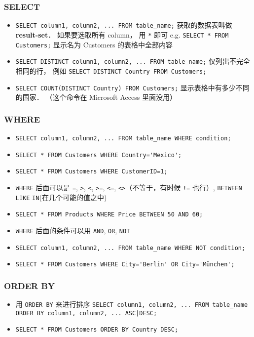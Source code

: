 \subsubsection{SELECT}
\begin{itemize}
\item \verb`SELECT column1, column2, ... FROM table_name;` 获取的数据表叫做 \textbf{result-set}． 如果要选取所有 column， 用 \verb`*` 即可 e.g. \verb`SELECT * FROM Customers;` 显示名为 Customers 的表格中全部内容
\item \verb`SELECT DISTINCT column1, column2, ... FROM table_name;` 仅列出不完全相同的行， 例如 \verb`SELECT DISTINCT Country FROM Customers;`
\item \verb`SELECT COUNT(DISTINCT Country) FROM Customers;` 显示表格中有多少不同的国家． （这个命令在 Microsoft Access 里面没用）
\end{itemize}

\subsubsection{WHERE}
\begin{itemize}
\item \verb`SELECT column1, column2, ... FROM table_name WHERE condition;`
\item \verb`SELECT * FROM Customers WHERE Country='Mexico';`
\item \verb`SELECT * FROM Customers WHERE CustomerID=1;`
\item \verb`WHERE` 后面可以是 \verb`=`, \verb`>`, \verb`<`, \verb`>=`, \verb`<=`, \verb`<>`（不等于，有时候 \verb`!=` 也行）, \verb`BETWEEN` \verb`LIKE` \verb`IN`(在几个可能的值之中)
\item \verb`SELECT * FROM Products WHERE Price BETWEEN 50 AND 60;`
\item \verb`WHERE` 后面的条件可以用 \verb`AND`, \verb`OR`, \verb`NOT`
\item \verb`SELECT column1, column2, ... FROM table_name WHERE NOT condition;`
\item \verb`SELECT * FROM Customers WHERE City='Berlin' OR City='München';`
\end{itemize}

\subsubsection{ORDER BY}
\begin{itemize}
\item 用 \verb`ORDER BY` 来进行排序 \verb`SELECT column1, column2, ... FROM table_name ORDER BY column1, column2, ... ASC|DESC;`
\item \verb`SELECT * FROM Customers ORDER BY Country DESC;`
\end{itemize}

